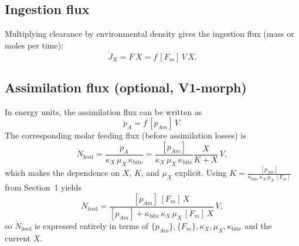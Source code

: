 \documentclass[11pt]{article}
\begin{document}
\subsection{Ingestion flux}
Multiplying clearance by environmental density gives the ingestion flux (mass or moles per time):
\[
	\dot{J}_X = F\,X = f\,[F_m]\,V\,X .
\]

\subsection{Assimilation flux (optional, V1-morph)}
In energy units, the assimilation flux can be written as
\[
	\dot{p}_A = f\,[p_{Am}]\,V .
\]
The corresponding molar feeding flux (before assimilation losses) is
\[
	\dot{N}_{\mathrm{feed}} = \frac{\dot{p}_A}{\kappa_X\,\mu_X\,\kappa_{\mathrm{bite}}} = \frac{[p_{Am}]}{\kappa_X\,\mu_X\,\kappa_{\mathrm{bite}}} \frac{X}{K + X}\,V ,
\]
which makes the dependence on \(X\), \(K\), and \(\mu_X\) explicit. Using \(K = \frac{[p_{Am}]}{\kappa_{\mathrm{bite}}\,\kappa_X\,\mu_X\,[F_m]}\) from Section~1 yields
\[
	\dot{N}_{\mathrm{feed}} = \frac{[p_{Am}]\,[F_m]\,X}{[p_{Am}] + \kappa_{\mathrm{bite}}\,\kappa_X\,\mu_X\,[F_m]\,X}\,V ,
\]
so \(\dot{N}_{\mathrm{feed}}\) is expressed entirely in terms of \(\{p_{Am}\}, \{F_m\}, \kappa_X, \mu_X, \kappa_{\mathrm{bite}}\) and the current \(X\).
\end{document}
